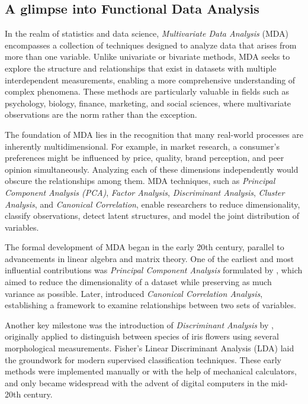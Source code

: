 \documentclass[article]{abntex2}
\begin{document}
\subsection{A glimpse into Functional Data Analysis}
In the realm of statistics and data science, \textit{Multivariate Data Analysis} (MDA) encompasses a collection of techniques designed to analyze data that arises from more than one variable. Unlike univariate or bivariate methods, MDA seeks to explore the structure and relationships that exist in datasets with multiple interdependent measurements, enabling a more comprehensive understanding of complex phenomena. These methods are particularly valuable in fields such as psychology, biology, finance, marketing, and social sciences, where multivariate observations are the norm rather than the exception.

The foundation of MDA lies in the recognition that many real-world processes are inherently multidimensional. For example, in market research, a consumer's preferences might be influenced by price, quality, brand perception, and peer opinion simultaneously. Analyzing each of these dimensions independently would obscure the relationships among them. MDA techniques, such as \textit{Principal Component Analysis (PCA)}, \textit{Factor Analysis}, \textit{Discriminant Analysis}, \textit{Cluster Analysis}, and \textit{Canonical Correlation}, enable researchers to reduce dimensionality, classify observations, detect latent structures, and model the joint distribution of variables.

The formal development of MDA began in the early 20th century, parallel to advancements in linear algebra and matrix theory. One of the earliest and most influential contributions was \textit{Principal Component Analysis} formulated by , which aimed to reduce the dimensionality of a dataset while preserving as much variance as possible. Later,  introduced \textit{Canonical Correlation Analysis}, establishing a framework to examine relationships between two sets of variables.

Another key milestone was the introduction of \textit{Discriminant Analysis} by , originally applied to distinguish between species of iris flowers using several morphological measurements. Fisher’s Linear Discriminant Analysis (LDA) laid the groundwork for modern supervised classification techniques. These early methods were implemented manually or with the help of mechanical calculators, and only became widespread with the advent of digital computers in the mid-20th century.
\end{document}
